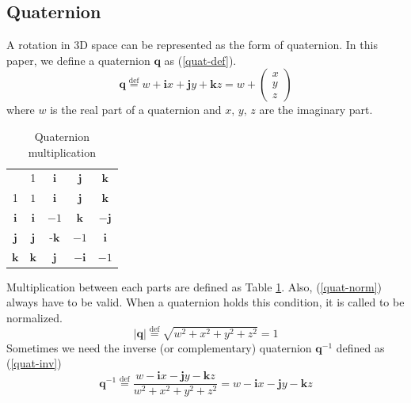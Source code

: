 \documentclass[journal]{IEEEtran}
\begin{document}
\subsection{Quaternion}
A rotation in 3D space can be represented as the form of quaternion.
In this paper, we define a quaternion \(\bm{q}\) as (\ref{quat-def}).
\begin{equation}
    \bm{q} \overset{\mathrm{def}}{=} w + \mathbf{i}x + \mathbf{j}y + \mathbf{k}z = w + \begin{pmatrix}
        x \\
        y \\
        z
    \end{pmatrix} \label{quat-def}
\end{equation}
where \(w\) is the real part of a quaternion and \(x,\,y,\,z\) are the imaginary part.
\begin{table}[tb]
    \centering
    \caption{Quaternion multiplication} \label{quat-mult}
    \begin{tabular}{ccccc}
    \rowcolor[HTML]{9B9B9B} 
                                           & 1              & \(\mathbf{i}\)  & \(\mathbf{j}\)  & \(\mathbf{k}\)  \\
    \cellcolor[HTML]{9B9B9B}1              & \(1\)          & \(\mathbf{i}\)  & \(\mathbf{j}\)  & \(\mathbf{k}\)  \\
    \rowcolor[HTML]{EFEFEF} 
    \cellcolor[HTML]{9B9B9B}\(\mathbf{i}\) & \(\mathbf{i}\) & \(-1\)          & \(\mathbf{k}\)  & \(-\mathbf{j}\) \\
    \cellcolor[HTML]{9B9B9B}\(\mathbf{j}\) & \(\mathbf{j}\) & -\(\mathbf{k}\) & \(-1\)          & \(\mathbf{i}\)  \\
    \rowcolor[HTML]{EFEFEF} 
    \cellcolor[HTML]{9B9B9B}\(\mathbf{k}\) & \(\mathbf{k}\) & \(\mathbf{j}\)  & \(-\mathbf{i}\) & \(-1\)         
    \end{tabular}
\end{table}
Multiplication between each parts are defined as Table \ref{quat-mult}.
Also, (\ref{quat-norm}) always have to be valid.
When a quaternion holds this condition, it is called to be normalized.
\begin{equation}
    |\bm{q}| \overset{\mathrm{def}}{=} \sqrt{w^2 + x^2 + y^2 + z^2} = 1 \label{quat-norm} 
\end{equation}
Sometimes we need the inverse (or complementary) quaternion \(\bm{q}^{-1}\) defined as (\ref{quat-inv})
\begin{equation}
    \bm{q}^{-1} \overset{\mathrm{def}}{=} \frac{w - \mathbf{i}x - \mathbf{j}y - \mathbf{k}z}{w^2 + x^2 + y^2 + z^2} = w - \mathbf{i}x - \mathbf{j}y - \mathbf{k}z \label{quat-inv}
\end{equation}
\end{document}
